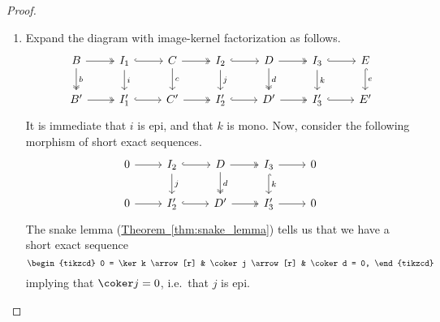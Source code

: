 \documentclass[main.tex]{subfiles}
\begin{document}
\begin{proof}
  \leavevmode
  \begin{enumerate}
    \item Expand the diagram with image-kernel factorization as follows.
      \begin{equation*}
        \begin{tikzcd}
          B
          \arrow[r, two heads]
          \arrow[d, two heads, "b"]
          & I_{1}
          \arrow[r, hook]
          \arrow[d, "i"]
          & C
          \arrow[r, two heads]
          \arrow[d, "c"]
          & I_{2}
          \arrow[r, hook]
          \arrow[d, "j"]
          & D
          \arrow[r, two heads]
          \arrow[d, two heads, "d"]
          & I_{3}
          \arrow[r, hook]
          \arrow[d, "k"]
          & E
          \arrow[d, hook, "e"]
          \\
          B'
          \arrow[r, two heads]
          & I_{1}'
          \arrow[r, hook]
          & C'
          \arrow[r, two heads]
          & I_{2}'
          \arrow[r, hook]
          & D'
          \arrow[r, two heads]
          & I_{3}'
          \arrow[r, hook]
          & E'
        \end{tikzcd}
      \end{equation*}
      It is immediate that $i$ is epi, and that $k$ is mono. Now, consider the following morphism of short exact sequences.
      \begin{equation*}
        \begin{tikzcd}
          0
          \arrow[r]
          & I_{2}
          \arrow[r, hook]
          \arrow[d, "j"]
          & D
          \arrow[r, two heads]
          \arrow[d, two heads, "d"]
          & I_{3}
          \arrow[r]
          \arrow[d, hook, "k"]
          & 0
          \\
          0
          \arrow[r]
          & I_{2}'
          \arrow[r, hook]
          & D'
          \arrow[r, two heads]
          & I_{3}'
          \arrow[r]
          & 0
        \end{tikzcd}
      \end{equation*}
      The snake lemma (\hyperref[thm:snake_lemma]{Theorem~\ref*{thm:snake_lemma}}) tells us that we have a short exact sequence
      \begin{equation*}
        \begin{tikzcd}
          0 = \ker k
          \arrow[r]
          & \coker j
          \arrow[r]
          & \coker d = 0,
        \end{tikzcd}
      \end{equation*}
      implying that $\coker j = 0$, i.e.\ that $j$ is epi.


\end{enumerate}
\end{proof}
\end{document}
